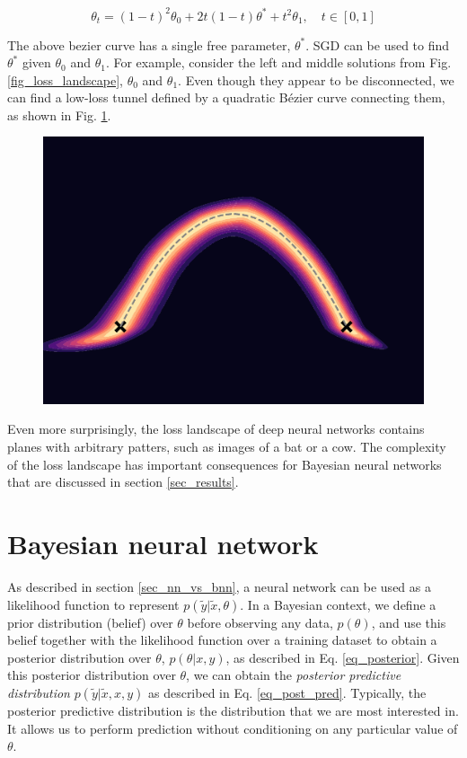 \documentclass[12pt]{article}
\begin{document}
\begin{equation}
\theta_t = (1-t)^2 \theta_0 + 2t(1-t) \theta^* + t^2 \theta_1, \quad t \in [0, 1]
\end{equation}

The above bezier curve has a single free parameter, $\theta^*$. SGD can be used to find $\theta^*$ given $\theta_0$ and $\theta_1$. For example, consider the left and middle solutions from Fig. \ref{fig_loss_landscape}, $\theta_0$ and $\theta_1$. Even though they appear to be disconnected, we can find a low-loss tunnel defined by a quadratic Bézier curve connecting them, as shown in Fig. \ref{fig_mode_connectivity}.

\begin{figure}[ht]
\centering
\includegraphics[width=12cm]{plots/mode_connectivity.pdf}
\caption{}
\label{fig_mode_connectivity}
\end{figure}

Even more surprisingly, the loss landscape of deep neural networks contains planes with arbitrary patters, such as images of a bat or a cow. \cite{sightseeing} The complexity of the loss landscape has important consequences for Bayesian neural networks that are discussed in section \ref{sec_results}.

\section{Bayesian neural network}

As described in section \ref{sec_nn_vs_bnn}, a neural network can be used as a likelihood function to represent $p(\tilde{y} | \tilde{x}, \theta)$. In a Bayesian context, we define a prior distribution (belief) over $\theta$ before observing any data, $p(\theta)$, and use this belief together with the likelihood function over a training dataset to obtain a posterior distribution over $\theta$, $p(\theta | x, y)$, as described in Eq. \ref{eq_posterior}. Given this posterior distribution over $\theta$, we can obtain the \textit{posterior predictive distribution} $p(\tilde{y} | \tilde{x}, x, y)$ as described in Eq. \ref{eq_post_pred}. Typically, the posterior predictive distribution is the distribution that we are most interested in. It allows us to perform prediction without conditioning on any particular value of $\theta$.
\end{document}
